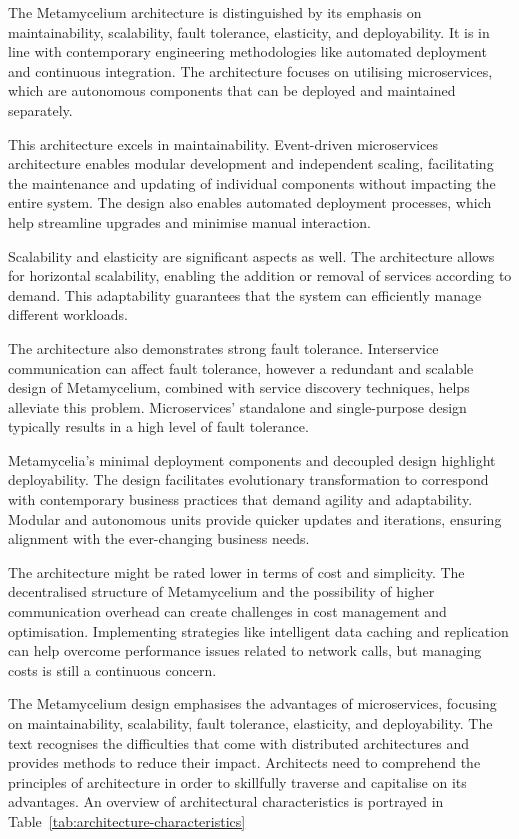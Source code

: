 \documentclass[preprint,12pt]{elsarticle}
\begin{document}
The Metamycelium architecture is distinguished by its emphasis on maintainability, scalability, fault tolerance, elasticity, and deployability. It is in line with contemporary engineering methodologies like automated deployment and continuous integration. The architecture focuses on utilising microservices, which are autonomous components that can be deployed and maintained separately.

This architecture excels in maintainability. Event-driven microservices architecture enables modular development and independent scaling, facilitating the maintenance and updating of individual components without impacting the entire system. The design also enables automated deployment processes, which help streamline upgrades and minimise manual interaction.

Scalability and elasticity are significant aspects as well. The architecture allows for horizontal scalability, enabling the addition or removal of services according to demand. This adaptability guarantees that the system can efficiently manage different workloads.

The architecture also demonstrates strong fault tolerance. Interservice communication can affect fault tolerance, however a redundant and scalable design of Metamycelium, combined with service discovery techniques, helps alleviate this problem. Microservices' standalone and single-purpose design typically results in a high level of fault tolerance.

Metamycelia's minimal deployment components and decoupled design highlight deployability. The design facilitates evolutionary transformation to correspond with contemporary business practices that demand agility and adaptability. Modular and autonomous units provide quicker updates and iterations, ensuring alignment with the ever-changing business needs.

The architecture might be rated lower in terms of cost and simplicity. The decentralised structure of Metamycelium and the possibility of higher communication overhead can create challenges in cost management and optimisation. Implementing strategies like intelligent data caching and replication can help overcome performance issues related to network calls, but managing costs is still a continuous concern.

The Metamycelium design emphasises the advantages of microservices, focusing on maintainability, scalability, fault tolerance, elasticity, and deployability. The text recognises the difficulties that come with distributed architectures and provides methods to reduce their impact. Architects need to comprehend the principles of architecture in order to skillfully traverse and capitalise on its advantages. An overview of architectural characteristics is portrayed in Table~\ref{tab:architecture-characteristics}
\end{document}
